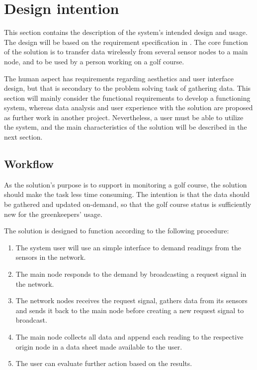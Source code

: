 \section{Design intention}
This section contains the description of the system's intended design and usage. The design will be based on the requirement specification in . The core function of the solution is to transfer data wirelessly from several sensor nodes to a main node, and to be used by a person working on a golf course. 

The human aspect has requirements regarding aesthetics and user interface design, but that is secondary to the problem solving task of gathering data. This section will mainly consider the functional requirements to develop a functioning system, whereas data analysis and user experience with the solution are proposed as further work in another project. Nevertheless, a user must be able to utilize the system, and the main characteristics of the solution will be described in the next section.

\subsection{Workflow}\label{cha:workflowDesign}
As the solution's purpose is to support in monitoring a golf course, the solution should make the task less time consuming. The intention is that the data should be gathered and updated on-demand, so that the golf course status is sufficiently new for the greenkeepers' usage.

The solution is designed to function according to the following procedure:
\begin{enumerate}
	\item The system user will use an simple interface to demand readings from the sensors in the network.
	\item The main node responds to the demand by broadcasting a request signal in the network.
	\item The network nodes receives the request signal, gathers data from its sensors and sends it back to the main node before creating a new request signal to broadcast.
	\item The main node collects all data and append each reading to the respective origin node in a data sheet made available to the user.
	\item The user can evaluate further action based on the results.
\end{enumerate}

